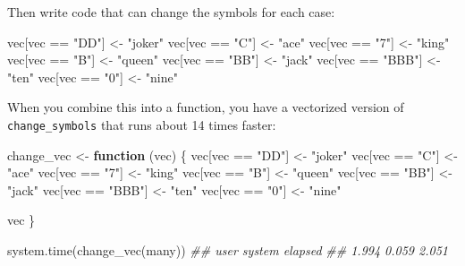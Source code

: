 \documentclass[
  letterpaper,
  DIV=11,
  numbers=noendperiod]{scrbook}
\newenvironment{Shaded}{\begin{snugshade}}{\end{snugshade}}
\newcommand{\ControlFlowTok}[1]{\textcolor[rgb]{0.00,0.23,0.31}{\textbf{#1}}}
\newcommand{\DocumentationTok}[1]{\textcolor[rgb]{0.37,0.37,0.37}{\textit{#1}}}
\newcommand{\FunctionTok}[1]{\textcolor[rgb]{0.28,0.35,0.67}{#1}}
\newcommand{\NormalTok}[1]{\textcolor[rgb]{0.00,0.23,0.31}{#1}}
\newcommand{\OtherTok}[1]{\textcolor[rgb]{0.00,0.23,0.31}{#1}}
\newcommand{\SpecialCharTok}[1]{\textcolor[rgb]{0.37,0.37,0.37}{#1}}
\newcommand{\StringTok}[1]{\textcolor[rgb]{0.13,0.47,0.30}{#1}}
\begin{document}
Then write code that can change the symbols for each case:

\begin{Shaded}
\begin{Highlighting}[]
\NormalTok{vec[vec }\SpecialCharTok{==} \StringTok{"DD"}\NormalTok{] }\OtherTok{\textless{}{-}} \StringTok{"joker"}
\NormalTok{vec[vec }\SpecialCharTok{==} \StringTok{"C"}\NormalTok{] }\OtherTok{\textless{}{-}} \StringTok{"ace"}
\NormalTok{vec[vec }\SpecialCharTok{==} \StringTok{"7"}\NormalTok{] }\OtherTok{\textless{}{-}} \StringTok{"king"}
\NormalTok{vec[vec }\SpecialCharTok{==} \StringTok{"B"}\NormalTok{] }\OtherTok{\textless{}{-}} \StringTok{"queen"}
\NormalTok{vec[vec }\SpecialCharTok{==} \StringTok{"BB"}\NormalTok{] }\OtherTok{\textless{}{-}} \StringTok{"jack"}
\NormalTok{vec[vec }\SpecialCharTok{==} \StringTok{"BBB"}\NormalTok{] }\OtherTok{\textless{}{-}} \StringTok{"ten"}
\NormalTok{vec[vec }\SpecialCharTok{==} \StringTok{"0"}\NormalTok{] }\OtherTok{\textless{}{-}} \StringTok{"nine"}
\end{Highlighting}
\end{Shaded}

When you combine this into a function, you have a vectorized version of
\texttt{change\_symbols} that runs about 14 times faster:

\begin{Shaded}
\begin{Highlighting}[]
\NormalTok{change\_vec }\OtherTok{\textless{}{-}} \ControlFlowTok{function}\NormalTok{ (vec) \{}
\NormalTok{  vec[vec }\SpecialCharTok{==} \StringTok{"DD"}\NormalTok{] }\OtherTok{\textless{}{-}} \StringTok{"joker"}
\NormalTok{  vec[vec }\SpecialCharTok{==} \StringTok{"C"}\NormalTok{] }\OtherTok{\textless{}{-}} \StringTok{"ace"}
\NormalTok{  vec[vec }\SpecialCharTok{==} \StringTok{"7"}\NormalTok{] }\OtherTok{\textless{}{-}} \StringTok{"king"}
\NormalTok{  vec[vec }\SpecialCharTok{==} \StringTok{"B"}\NormalTok{] }\OtherTok{\textless{}{-}} \StringTok{"queen"}
\NormalTok{  vec[vec }\SpecialCharTok{==} \StringTok{"BB"}\NormalTok{] }\OtherTok{\textless{}{-}} \StringTok{"jack"}
\NormalTok{  vec[vec }\SpecialCharTok{==} \StringTok{"BBB"}\NormalTok{] }\OtherTok{\textless{}{-}} \StringTok{"ten"}
\NormalTok{  vec[vec }\SpecialCharTok{==} \StringTok{"0"}\NormalTok{] }\OtherTok{\textless{}{-}} \StringTok{"nine"}
  
\NormalTok{  vec}
\NormalTok{\}}

\FunctionTok{system.time}\NormalTok{(}\FunctionTok{change\_vec}\NormalTok{(many))}
\DocumentationTok{\#\#   user  system elapsed }
\DocumentationTok{\#\#  1.994   0.059   2.051 }
\end{Highlighting}
\end{Shaded}
\end{document}
